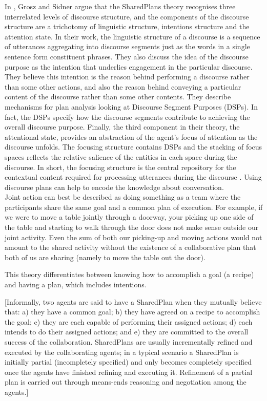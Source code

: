 \documentclass[11pt]{article}
\begin{document}
In \cite{grosz:plans-discourse}, Grosz and Sidner argue that the SharedPlans
theory recognises three interrelated levels of discourse structure, and the
components of the discourse structure are a trichotomy of linguistic structure,
intentions structure and the attention state. In their work, the linguistic
structure of a discourse is a sequence of utterances aggregating into discourse
segments just as the words in a single sentence form constituent phrases. They
also discuss the idea of the discourse purpose as the intention that underlies
engagement in the particular discourse. They believe this intention is the
reason behind performing a discourse rather than some other actions, and also
the reason behind conveying a particular content of the discourse rather than
some other contents. They describe mechanisms for plan analysis looking at
Discourse Segment Purposes (DSPs). In fact, the DSPs specify how the discourse
segments contribute to achieving the overall discourse purpose. Finally, the
third component in their theory, the attentional state, provides an abstraction
of the agent's focus of attention as the discourse unfolds. The focusing
structure contains DSPs and the stacking of focus spaces reflects the relative
salience of the entities in each space during the discourse. In short, the
focusing structure is the central repository for the contextual content required
for processing utterances during the discourse \cite{grosz:plans-discourse}.
Using discourse plans can help to encode the knowledge about conversation.\\




Joint action can best be described as doing something as a team where the
participants share the same goal and a common plan of execution. For example, if
we were to move a table jointly through a doorway, your picking up one side of
the table and starting to walk through the door does not make sense outside our
joint activity. Even the sum of both our picking-up and moving actions would not
amount to the shared activity without the existence of a collaborative plan that
both of us are sharing (namely to move the table out the door).

This theory differentiates between knowing how to accomplish a goal (a recipe)
and having a plan, which includes intentions. 

[Informally, two agents are said to have a SharedPlan when  they mutually
believe that: a) they have a common goal; b) they have agreed on a recipe to accomplish
the goal; c) they are each capable of performing their assigned actions; d) each
intends to do their assigned actions; and e) they are committed to the overall
success of the collaboration. SharedPlans are usually incrementally refined and
executed by the collaborating agents; in a typical scenario a SharedPlan is
initially partial (incompletely specified) and only becomes completely specified
once the agents have finished refining and executing it. Refinement of a partial
plan is carried out through means-ends reasoning and negotiation among the
agents.]
\end{document}
